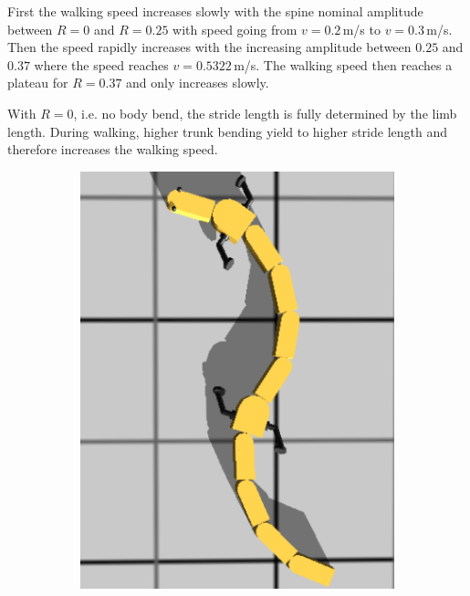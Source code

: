\documentclass[a4paper]{scrartcl}
\begin{document}
{First the walking speed increases slowly with the spine nominal amplitude between $R=0$ and $R=0.25$ with speed going from $v = 0.2$\,m/s to $v = 0.3$\,m/s. Then the speed rapidly increases with the increasing amplitude between $0.25$ and $0.37$ where the speed reaches $v = 0.5322$\,m/s. The walking speed then reaches a plateau for $R=0.37$ and only increases slowly.

With $R=0$, i.e. no body bend, the stride length is fully determined by the limb length. During walking, higher trunk bending yield to higher stride length and therefore increases the walking speed. 
 
\begin{figure}
 \centering
 \begin{subfigure}[b]{0.45\linewidth}
  \centering
  \includegraphics[width=\textwidth]{Figures/figure3Ab.png}
  \caption{\label{fig:bend_R_0.25}}
 \end{subfigure}
 \begin{subfigure}[b]{0.45\linewidth}

\end{subfigure}
\end{figure}}
\end{document}
